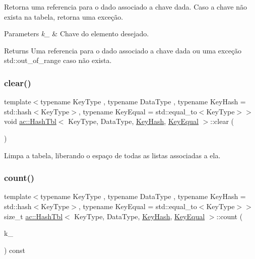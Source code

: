 Retorna uma referencia para o dado associado a chave dada. Caso a chave não exista na tabela, retorna uma exceção. 
\begin{DoxyParams}{Parameters}
{\em k\+\_\+} & Chave do elemento desejado. \\
\hline
\end{DoxyParams}
\begin{DoxyReturn}{Returns}
Uma referencia para o dado associado a chave dada ou uma exceção std\+::out\+\_\+of\+\_\+range caso não exista. 
\end{DoxyReturn}
\mbox{\label{classac_1_1_hash_tbl_a4fda203a257af1e3913128f03926878f}} 
\subsubsection{\texorpdfstring{clear()}{clear()}}
{\footnotesize\ttfamily template$<$typename Key\+Type , typename Data\+Type , typename Key\+Hash  = std\+::hash$<$\+Key\+Type$>$, typename Key\+Equal  = std\+::equal\+\_\+to$<$\+Key\+Type$>$$>$ \\
void \hyperlink{classac_1_1_hash_tbl}{ac\+::\+Hash\+Tbl}$<$ Key\+Type, Data\+Type, \hyperlink{struct_key_hash}{Key\+Hash}, \hyperlink{struct_key_equal}{Key\+Equal} $>$\+::clear (\begin{DoxyParamCaption}\item[{void}]{ }\end{DoxyParamCaption})\hspace{0.3cm}{\ttfamily [inline]}}

Limpa a tabela, liberando o espaço de todas as listas associadas a ela. \mbox{\label{classac_1_1_hash_tbl_a298f6cb0fe45caa944a0c2bf465397b2}} 
\subsubsection{\texorpdfstring{count()}{count()}}
{\footnotesize\ttfamily template$<$typename Key\+Type , typename Data\+Type , typename Key\+Hash  = std\+::hash$<$\+Key\+Type$>$, typename Key\+Equal  = std\+::equal\+\_\+to$<$\+Key\+Type$>$$>$ \\
size\+\_\+t \hyperlink{classac_1_1_hash_tbl}{ac\+::\+Hash\+Tbl}$<$ Key\+Type, Data\+Type, \hyperlink{struct_key_hash}{Key\+Hash}, \hyperlink{struct_key_equal}{Key\+Equal} $>$\+::count (\begin{DoxyParamCaption}\item[{const Key\+Type \&}]{k\+\_\+ }\end{DoxyParamCaption}) const\hspace{0.3cm}{\ttfamily [inline]}}

